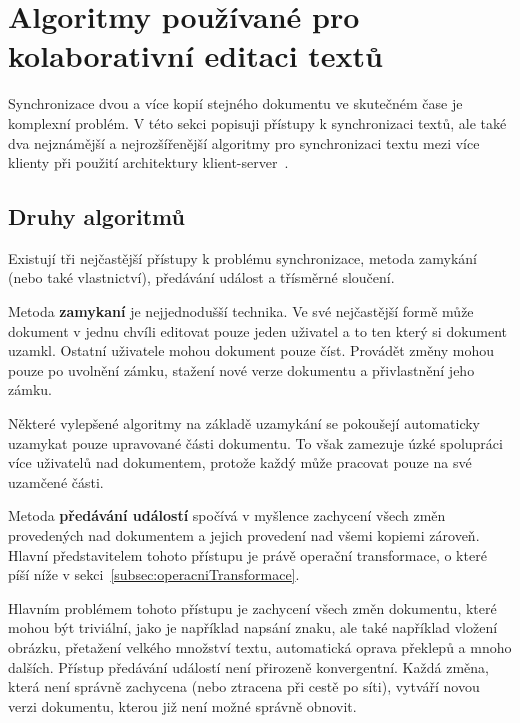 
\section{Algoritmy používané pro kolaborativní editaci textů}\label{sec:algoritmyProKolaborativníEditaci}

Synchronizace dvou a více kopií stejného dokumentu ve skutečném čase je komplexní problém.
V této sekci popisuji přístupy k synchronizaci textů, ale také dva nejznámější a nejrozšířenější algoritmy pro synchronizaci textu mezi více klienty při použití architektury klient-server~\cite{algoritmy:first}.

\subsection{Druhy algoritmů}\label{subsec:druhyAlgoritmů}

Existují tři nejčastější přístupy k problému synchronizace, metoda zamykání (nebo také vlastnictví), předávání událost a třísměrné sloučení.

Metoda \textbf{zamykaní} je nejjednodušší technika.
Ve své nejčastější formě může dokument v jednu chvíli editovat pouze jeden uživatel a to ten který si dokument uzamkl.
Ostatní uživatele mohou dokument pouze číst.
Provádět změny mohou pouze po uvolnění zámku, stažení nové verze dokumentu a přivlastnění jeho zámku.

Některé vylepšené algoritmy na základě uzamykání se pokoušejí automaticky uzamykat pouze upravované části dokumentu.
To však zamezuje úzké spolupráci více uživatelů nad dokumentem, protože každý může pracovat pouze na své uzamčené části.

Metoda \textbf{předávání událostí} spočívá v myšlence zachycení všech změn provedených nad dokumentem a jejich provedení nad všemi kopiemi zároveň.
Hlavní představitelem tohoto přístupu je právě operační transformace, o které píší níže v sekci~\ref{subsec:operacniTransformace}.

Hlavním problémem tohoto přístupu je zachycení všech změn dokumentu, které mohou být triviální, jako je například napsání znaku, ale také například vložení obrázku, přetažení velkého množství textu, automatická oprava překlepů a mnoho dalších.
Přístup předávání událostí není přirozeně konvergentní.
Každá změna, která není správně zachycena (nebo ztracena při cestě po síti), vytváří novou verzi dokumentu, kterou již není možné správně obnovit.

